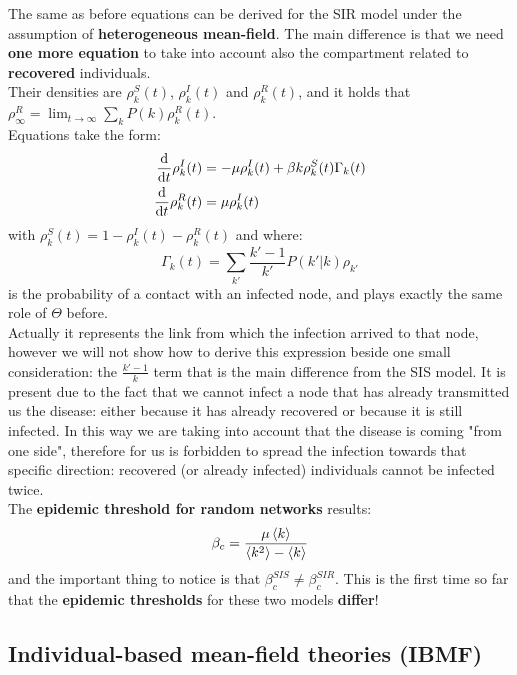 \documentclass[../main/main.tex]{subfiles}
\begin{document}
The same as before equations can be derived for the SIR model under the assumption of \textbf{heterogeneous mean-field}. The main difference is that we need \textbf{one more equation} to take into account also the compartment related to \textbf{recovered} individuals.\\ Their densities are \( \rho _k^S(t) \), \( \rho _k^I (t) \) and \( \rho _k^R (t) \), and it holds that \( \rho _ \infty ^R = \lim_{t \rightarrow \infty } \sum_{k}^{} P(k) \rho _k^R (t) \).\\
Equations take the form:
\begin{equation}
\begin{split}
  \dv{}{t} \rho _k^I (t) &= - \mu \rho _k^I (t) + \beta k \rho _k^S (t) \Gamma _k(t)  \\
  \dv{}{t} \rho _k^R (t) &= \mu \rho _k^I (t)
\end{split}
\end{equation}
with \( \rho _k^S (t) = 1 - \rho _k^I (t) - \rho _k^R (t)\) and where:
\begin{equation}
  \Gamma _k (t) = \sum_{k'}^{} \frac{k'-1}{k'} P(k'|k) \rho _{k'}
\end{equation}
is the probability of a contact with an infected node, and plays exactly the same role of \( \Theta  \) before.\\
Actually it represents the link from which the infection arrived to that node, however we will not show how to derive this expression beside one small consideration: the $\frac{k'-1}{k}$ term that is the main difference from the SIS model. It is present due to the fact that we cannot infect a node that has already transmitted us the disease: either because it has already recovered or because it is still infected. In this way we are taking into account that the disease is coming "from one side", therefore for us is forbidden to spread the infection towards that specific direction: recovered (or already infected) individuals cannot be infected twice.\\

The \textbf{epidemic threshold for random networks} results:
\begin{equation}
  \beta _c = \frac{\mu \expval{k} }{\expval{k^2} - \expval{k} }
\end{equation}
and the important thing to notice is that \( \beta _c^{SIS} \neq \beta _c^{SIR} \). This is the first time so far that the \textbf{epidemic thresholds} for these two models \textbf{differ}!

\subsection{Individual-based mean-field theories (IBMF)}
\end{document}
